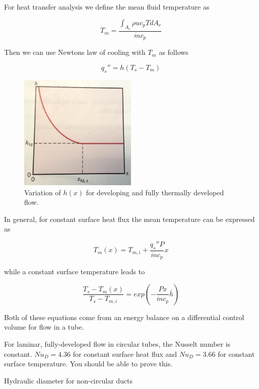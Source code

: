 \documentclass[paper=letter, fontsize=11pt]{scrartcl}
\numberwithin{equation}{section}        %
\numberwithin{figure}{section}          %
\numberwithin{table}{section}               %
\begin{document}
For heat transfer analysis we define the mean fluid temperature as

\begin{equation}
T_m = \frac{\int_{A_c} \rho u c_p T dA_c}{\dot m c_p}
\end{equation}

Then we can use Newtons law of cooling with $T_m$ as follows

\begin{equation}
q_s'' = h(T_s - T_m)
\end{equation}

\begin{figure}[!ht]
\centering
\includegraphics[width=0.5\textwidth]{./Figures/hx}
\caption{Variation of $h(x)$ for developing and fully thermally developed flow.}
\end{figure}

In general, for constant surface heat flux the mean temperature can be expressed as

\begin{equation}
T_m(x) = T_{m,i} + \frac{q_s'' P}{\dot m c_p}x
\end{equation}

\noindent while a constant surface temperature leads to 

\begin{equation}
\frac{T_s - T_m(x)}{T_s - T_{m,i}} = exp\left(-\frac{Px}{\dot m c_p}\bar h\right)
\end{equation}

Both of these equations come from an energy balance on a differential control volume for flow in a tube.

For laminar, fully-developed flow in circular tubes, the Nusselt number is constant. $Nu_D = 4.36$ for constant surface heat flux and $Nu_D=3.66$ for constant surface temperature. You should be able to prove this.

Hydraulic diameter for non-circular ducts
\end{document}
